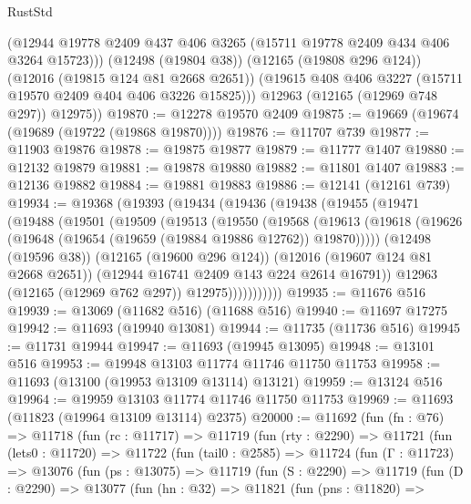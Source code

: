 \begin{lexlean}{RustStd}
\begin{coremodule}
            (@12944 @19778 @2409 @437 @406 @3265 (@15711 @19778 @2409 @434 @406 @3264 @15723)))
          (@12498 (@19804 @38))
          (@12165 (@19808 @296 @124))
          (@12016 (@19815 @124 @81 @2668 @2651))
          (@19615 @408 @406 @3227 (@15711 @19570 @2409 @404 @406 @3226 @15825)))
        @12963
        (@12165 (@12969 @748 @297))
        @12975))
@19870 := @12278 @19570 @2409
@19875 := @19669 (@19674 (@19689 (@19722 (@19868 @19870))))
@19876 := @11707 @739
@19877 := @11903 @19876
@19878 := @19875 @19877
@19879 := @11777 @1407
@19880 := @12132 @19879
@19881 := @19878 @19880
@19882 := @11801 @1407
@19883 := @12136 @19882
@19884 := @19881 @19883
@19886 := @12141 (@12161 @739)
@19934 := @19368
    (@19393
      (@19434
        (@19436
          (@19438
            (@19455
              (@19471
                (@19488
                  (@19501
                    (@19509
                      (@19513
                        (@19550
                          (@19568
                            (@19613
                              (@19618
                                (@19626 (@19648 (@19654 (@19659 (@19884 @19886 @12762)) @19870)))))
                            (@12498 (@19596 @38))
                            (@12165 (@19600 @296 @124))
                            (@12016 (@19607 @124 @81 @2668 @2651))
                            (@12944 @16741 @2409 @143 @224 @2614 @16791))
                          @12963
                          (@12165 (@12969 @762 @297))
                          @12975)))))))))))
@19935 := @11676 @516
@19939 := @13069 (@11682 @516) (@11688 @516)
@19940 := @11697 @17275
@19942 := @11693 (@19940 @13081)
@19944 := @11735 (@11736 @516)
@19945 := @11731 @19944
@19947 := @11693 (@19945 @13095)
@19948 := @13101 @516
@19953 := @19948 @13103 @11774 @11746 @11750 @11753
@19958 := @11693 (@13100 (@19953 @13109 @13114) @13121)
@19959 := @13124 @516
@19964 := @19959 @13103 @11774 @11746 @11750 @11753
@19969 := @11693 (@11823 (@19964 @13109 @13114) @2375)
@20000 := @11692
    (fun (fn : @76) =>
    @11718
      (fun (rc : @11717) =>
      @11719
        (fun (rty : @2290) =>
        @11721
          (fun (lets0 : @11720) =>
          @11722
            (fun (tail0 : @2585) =>
            @11724
              (fun (Γ : @11723) =>
              @13076
                (fun (ps : @13075) =>
                @11719
                  (fun (S : @2290) =>
                  @11719
                    (fun (D : @2290) =>
                    @13077
                      (fun (hn : @32) =>
                      @11821
                        (fun (pns : @11820) =>

\end{coremodule}
\end{lexlean}
